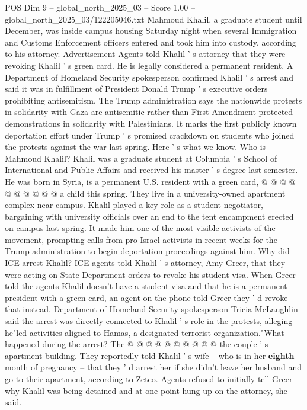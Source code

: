 \begin{textsample}{POS Dim 9 – global\_north\_2025\_03 – Score 1.00 – global\_north\_2025\_03/122205046.txt}  \label{ex:f9_pos_383}
Mahmoud Khalil, a graduate student until December, was inside campus housing Saturday night when several Immigration and Customs Enforcement officers entered and took him into custody, according to his attorney.
Advertisement Agents told Khalil ' s attorney that they were revoking Khalil ' s green card.
He is legally considered a permanent resident.
A Department of Homeland Security spokesperson confirmed Khalil ' s arrest and said it was in fulfillment of President Donald Trump ' s executive orders prohibiting antisemitism.
The Trump administration says the nationwide protests in solidarity with Gaza are antisemitic rather than First Amendment-protected demonstrations in solidarity with Palestinians.
It marks the first publicly known deportation effort under Trump ' s promised crackdown on students who joined the protests against the war last spring.
Here ' s what we know.
Who is Mahmoud Khalil?
Khalil was a graduate student at Columbia ' s School of International and Public Affairs and received his master ' s degree last semester.
He was born in Syria, is a permanent U.S. resident with a green card, @ @ @ @ @ @ @ @ @ @ a child this spring.
They live in a university-owned apartment complex near campus.
Khalil played a key role as a student negotiator, bargaining with university officials over an end to the tent encampment erected on campus last spring.
It made him one of the most visible activists of the movement, prompting calls from pro-Israel activists in recent weeks for the Trump administration to begin deportation proceedings against him.
Why did ICE arrest Khalil?
ICE agents told Khalil ' s attorney, Amy Greer, that they were acting on State Department orders to revoke his student visa.
When Greer told the agents Khalil doesn't have a student visa and that he is a permanent president with a green card, an agent on the phone told Greer they ' d revoke that instead.
Department of Homeland Security spokesperson Tricia McLaughlin said the arrest was directly connected to Khalil ' s role in the protests, alleging he"led activities aligned to Hamas, a designated terrorist organization."What happened during the arrest?
The @ @ @ @ @ @ @ @ @ @ the couple ' s apartment building.
They reportedly told Khalil ' s wife -- who is in her \textbf{eighth} month of pregnancy -- that they ' d arrest her if she didn't leave her husband and go to their apartment, according to Zeteo.
Agents refused to initially tell Greer why Khalil was being detained and at one point hung up on the attorney, she said.

\end{textsample}
